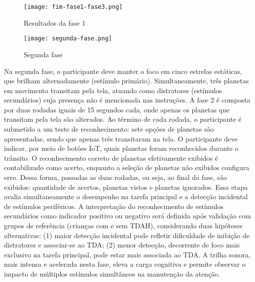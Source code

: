 \begin{figure}[H]
    \centering
    \caption{Resultados da fase 1}%
    \label{fig:fim-fase1-fase3}
    \texttt{[image: fim-fase1-fase3.png]}%
\end{figure}

\begin{figure}[H]
    \centering
    \caption{Segunda fase}%
    \label{fig:segunda-fase}
    \texttt{[image: segunda-fase.png]}%
\end{figure}

Na segunda fase, o participante deve manter o foco em cinco estrelas estáticas, que brilham alternadamente (estímulo primário). Simultaneamente, três planetas em movimento transitam pela tela, atuando como distratores (estímulos secundários) cuja presença não é mencionada nas instruções. A fase 2 é composta por duas rodadas iguais de 15 segundos cada, onde apenas os planetas que transitam pela tela são alterados. Ao término de cada rodada, o participante é submetido a um teste de reconhecimento: sete opções de planetas são apresentadas, sendo que apenas três transitaram na tela. O participante deve indicar, por meio de botões IoT, quais planetas foram reconhecidos durante o trânsito. O reconhecimento correto de planetas efetivamente exibidos é contabilizado como acerto, enquanto a seleção de planetas não exibidos configura erro. Dessa forma, passadas as duas rodadas, ou seja, ao final da fase, são exibidos: quantidade de acertos, planetas vistos e planetas ignorados. Essa etapa avalia simultaneamente o desempenho na tarefa principal e a detecção incidental de estímulos periféricos. A interpretação do reconhecimento de estímulos secundários como indicador positivo ou negativo será definida após validação com grupos de referência (crianças com e sem TDAH), considerando duas hipóteses alternativas: (1) maior detecção incidental pode refletir dificuldade de inibição de distratores e associar-se ao TDA; (2) menor detecção, decorrente de foco mais exclusivo na tarefa principal, pode estar mais associada ao TDA. A trilha sonora, mais intensa e acelerada nesta fase, eleva a carga cognitiva e permite observar o impacto de múltiplos estímulos simultâneos na manutenção da atenção.


